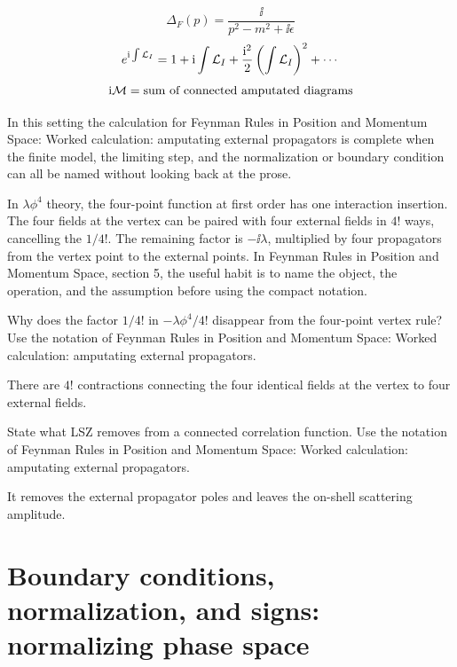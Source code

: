 \[
  \Delta_F(p)=\frac{\ii}{p^2-m^2+\ii\epsilon}
\]
\[
  e^{\mathrm i\int\mathcal L_I}=1+\mathrm i\int\mathcal L_I+\frac{\mathrm i^2}{2}\left(\int\mathcal L_I\right)^2+\cdots
\]
\[
  \mathrm i\mathcal M=\hbox{sum of connected amputated diagrams}
\]

In this setting the calculation for Feynman Rules in Position and Momentum Space: Worked calculation: amputating external propagators is complete when the finite model, the limiting step, and the normalization or boundary condition can all be named without looking back at the prose.




\begin{example}
In \(\lambda\phi^4\) theory, the four-point function at first order has one interaction insertion.  The four fields at the vertex can be paired with four external fields in \(4!\) ways, cancelling the \(1/4!\).  The remaining factor is \(-\ii\lambda\), multiplied by four propagators from the vertex point to the external points.  In Feynman Rules in Position and Momentum Space, section 5, the useful habit is to name the object, the operation, and the assumption before using the compact notation.
\end{example}



\begin{exercise}
Why does the factor \(1/4!\) in \(-\lambda\phi^4/4!\) disappear from the four-point vertex rule?  Use the notation of Feynman Rules in Position and Momentum Space: Worked calculation: amputating external propagators.
\begin{answer}
There are \(4!\) contractions connecting the four identical fields at the vertex to four external fields.
\end{answer}
\end{exercise}

\begin{exercise}
State what LSZ removes from a connected correlation function.  Use the notation of Feynman Rules in Position and Momentum Space: Worked calculation: amputating external propagators.
\begin{answer}
It removes the external propagator poles and leaves the on-shell scattering amplitude.
\end{answer}
\end{exercise}



\section{Boundary conditions, normalization, and signs: normalizing phase space}

